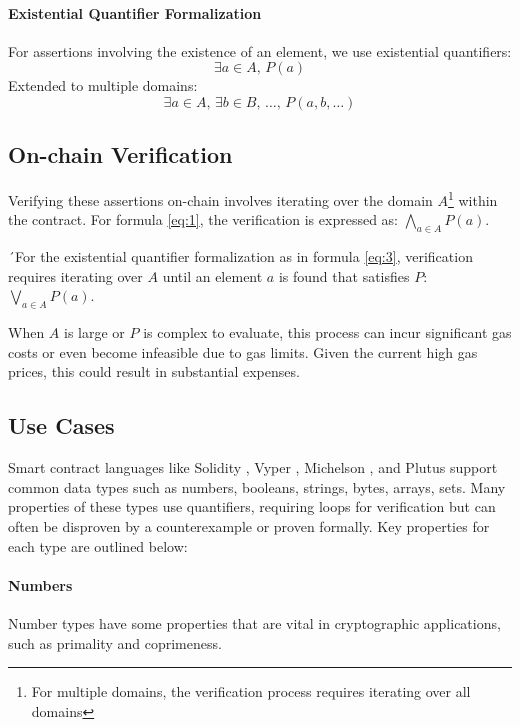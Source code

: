 \documentclass[runningheads]{llncs}
\begin{document}
\paragraph{Existential Quantifier Formalization}
For assertions involving the existence of an element, we use existential quantifiers:
\begin{equation} \label{eq:3}
    \exists a \in A, \, P(a)
\end{equation}
Extended to multiple domains:
\begin{equation} \label{eq:4}
    \exists a \in A, \, \exists b \in B, \, \dots, \, P(a, b, \dots)
\end{equation}
\subsection{On-chain Verification}
Verifying these assertions on-chain involves iterating over the domain \(A\)\footnote{For multiple domains, the verification process requires iterating over all domains} within the contract. For formula \ref{eq:1}, the verification is expressed as: \(   \bigwedge_{a \in A} P(a)\).

´For the existential quantifier formalization as in formula \ref{eq:3}, verification requires iterating over \(A\) until an element \(a\) is found that satisfies \(P\): \(\bigvee_{a \in A} P(a)\).

When \(A\) is large or \(P\) is complex to evaluate, this process can incur significant gas costs or even become infeasible due to gas limits. Given the current high gas prices, this could result in substantial expenses.
\subsection{Use Cases}
Smart contract languages like Solidity \cite{solidity}, Vyper \cite{vyper}, Michelson \cite{michelson,michelson1}, and Plutus \cite{plutus} support common data types such as numbers, booleans, strings, bytes, arrays, sets. Many properties of these types use quantifiers, requiring loops for verification but can often be disproven by a counterexample or proven formally. Key properties for each type are outlined below:
\paragraph{\textbf{Numbers}}
Number types have some properties that are vital in cryptographic applications, such as primality and coprimeness. %
\end{document}
